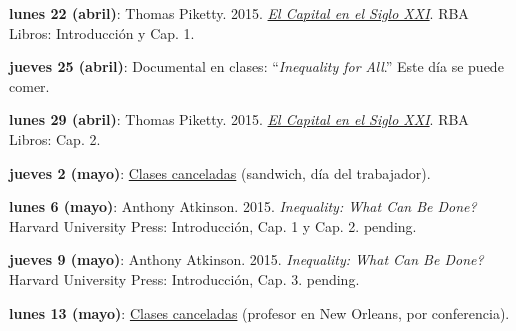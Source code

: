 \documentclass[letterpaper]{article}
\renewenvironment{itemize}{
  \begin{list}{}{
    \setlength{\leftmargin}{1.5em}
  }
}{
  \end{list}
}
\begin{document}
\begin{enumerate}
\begin{itemize}
		\vspace{0.2cm}

		\item {\bf lunes 22 (abril)}: Thomas Piketty. 2015. \href{https://github.com/hbahamonde/Intro_Ciencias_Sociales/raw/master/Readings/Piketty_El_capital.pdf}{\emph{El Capital en el Siglo XXI}}. RBA Libros: Introducci\'on y Cap. 1.

		\vspace{0.2cm}

		\item[] {\bf jueves 25 (abril)}: Documental en clases: ``\emph{Inequality for All}.'' Este d\'ia se puede comer. %

		\vspace{0.2cm}

		\item {\bf lunes 29 (abril)}: Thomas Piketty. 2015. \href{https://github.com/hbahamonde/Intro_Ciencias_Sociales/raw/master/Readings/Piketty_El_capital.pdf}{\emph{El Capital en el Siglo XXI}}. RBA Libros: Cap. 2.

		\vspace{0.2cm}

		\item[] {\bf jueves 2 (mayo)}: {\underline{Clases canceladas} (sandwich, d\'ia del trabajador).}

		\vspace{0.2cm}

		\item {\bf lunes 6 (mayo)}: Anthony Atkinson. 2015. \emph{Inequality: What Can Be Done?} Harvard University Press: Introducci\'on, Cap. 1 y Cap. 2. {\color{red}pending.}

		\vspace{0.2cm}

		\item {\bf jueves 9 (mayo)}: Anthony Atkinson. 2015. \emph{Inequality: What Can Be Done?} Harvard University Press: Introducci\'on, Cap. 3. {\color{red}pending.}

		\vspace{0.2cm}

		\item[] {\bf lunes 13 (mayo)}: {\underline{Clases canceladas} (profesor en New Orleans, por conferencia).}

		\vspace{0.2cm}


\end{itemize}
\end{enumerate}
\end{document}
